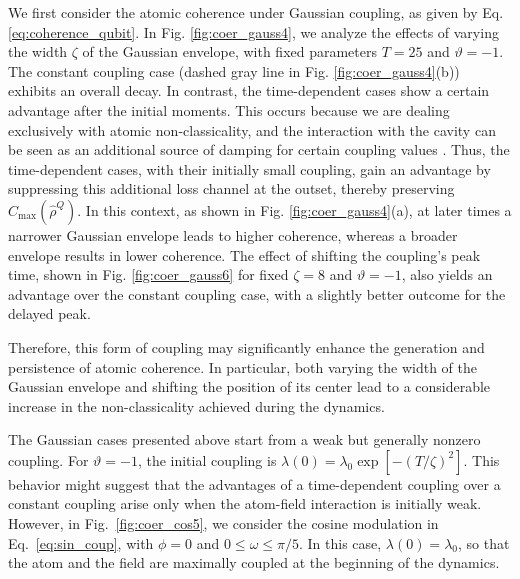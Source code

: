 \documentclass[aps,pre,superscriptaddress,twocolumn,10pt]{revtex4-2}
\begin{document}
We first consider the atomic coherence under Gaussian coupling, as given by Eq. \eqref{eq:coherence_qubit}.
In Fig. \ref{fig:coer_gauss4}, we analyze the effects of varying the width $\zeta$ of the Gaussian envelope, with fixed parameters $T = 25$ and $\vartheta = -1$.
The constant coupling case (dashed gray line in Fig. \ref{fig:coer_gauss4}(b)) exhibits an overall decay. In contrast, the time-dependent cases show a certain advantage after the initial moments. This occurs because we are dealing exclusively with atomic non-classicality, and the interaction with the cavity can be seen as an additional source of damping for certain coupling values \cite{Auffeves2010}.
Thus, the time-dependent cases, with their initially small coupling, gain an advantage by suppressing this additional loss channel at the outset, thereby preserving $C_{\text{max}}(\hat{\rho}^{Q})$.
In this context, as shown in Fig. \ref{fig:coer_gauss4}(a), at later times a narrower Gaussian envelope leads to higher coherence, whereas a broader envelope results in lower coherence.
The effect of shifting the coupling's peak time, shown in Fig. \ref{fig:coer_gauss6} for fixed $\zeta=8$ and $\vartheta=-1$, also yields an advantage over the constant coupling case, with a slightly better outcome for the delayed peak.

Therefore, this form of coupling may significantly enhance the generation and persistence of atomic coherence. 
In particular, both varying the width of the Gaussian envelope and shifting the position of its center lead to a considerable increase in the non-classicality achieved during the dynamics. 

The Gaussian cases presented above start from a weak but generally nonzero coupling. For $\vartheta=-1$, the initial coupling is
$\lambda(0)=\lambda_0\exp[-(T/\zeta)^2]$.
This behavior might suggest that the advantages of a time-dependent coupling over a constant coupling arise only when the atom-field interaction is initially weak.
However, in Fig.~\ref{fig:coer_cos5}, we consider the cosine modulation in Eq.~\eqref{eq:sin_coup}, with $\phi=0$ and $0\leq\omega\leq\pi/5$. In this case, $\lambda(0)=\lambda_0$, so that the atom and the field are maximally coupled at the beginning of the dynamics.
\end{document}
